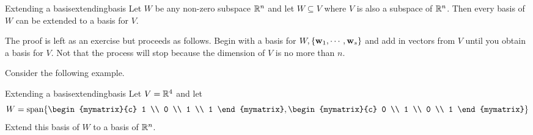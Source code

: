 \begin{theorem}{Extending a basis}{extendingbasis}
Let $W$ be any non-zero subspace $\mathbb{R}^{n}$ and let $W\subseteq V$
where $V$ is also a subspace of $\mathbb{R}^{n}$. Then every basis of $W$
can be extended to a basis for $V$.
\end{theorem}

The proof is left as an exercise but proceeds as follows. Begin with a basis for $W,\{{\bf w}_{1},\cdots ,{\bf w}_{s}\} $ and add in vectors from $V$ until you obtain a basis for $V$.
Not that the process will stop because the dimension of $V$ is no more than $n$. 

Consider the following example.

\begin{example}{Extending a basis}{extendingbasis}
Let $V=\mathbb{R}^{4}$ and let 
\begin{equation*}
W=\func{span}\set{\begin{mymatrix}{c}
1 \\ 
0 \\ 
1 \\ 
1
\end{mymatrix} ,\begin{mymatrix}{c}
0 \\ 
1 \\ 
0 \\ 
1
\end{mymatrix} }
\end{equation*}
Extend this basis of $W$ to a basis of $\mathbb{R}^{n}$.
\end{example}

